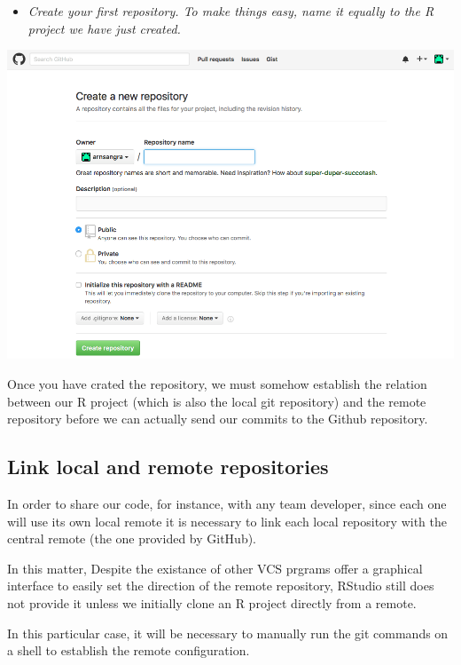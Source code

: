 \documentclass[]{article}
\providecommand{\tightlist}{%
  \setlength{\itemsep}{0pt}\setlength{\parskip}{0pt}}
\begin{document}
\begin{itemize}
\tightlist
\item
  \emph{Create your first repository. To make things easy, name it
  equally to the R project we have just created.}
\end{itemize}

\begin{center}\includegraphics[width=600px]{figures/new_github_repo} \end{center}

Once you have crated the repository, we must somehow establish the
relation between our R project (which is also the local git repository)
and the remote repository before we can actually send our commits to the
Github repository.

\subsection{Link local and remote
repositories}\label{link-local-and-remote-repositories}

In order to share our code, for instance, with any team developer, since
each one will use its own local remote it is necessary to link each
local repository with the central remote (the one provided by GitHub).

In this matter, Despite the existance of other VCS prgrams offer a
graphical interface to easily set the direction of the remote
repository, RStudio still does not provide it unless we initially clone
an R project directly from a remote.

In this particular case, it will be necessary to manually run the git
commands on a shell to establish the remote configuration.
\end{document}
